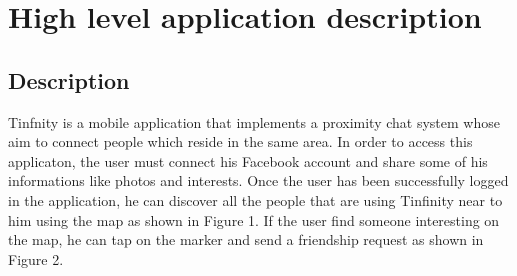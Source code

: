
\section{High level application description}

\subsection{Description}
Tinfnity is a mobile application that implements a proximity chat system whose aim to connect people which reside in the same area. In order to access this applicaton, the user must connect his Facebook account and share some of his informations like photos and interests. Once the user has been successfully logged in the application, he can discover all the people that are using Tinfinity near to him using the map as shown in Figure 1. If the user find someone interesting on the map, he can tap on the marker and send a friendship request as shown in Figure 2.

